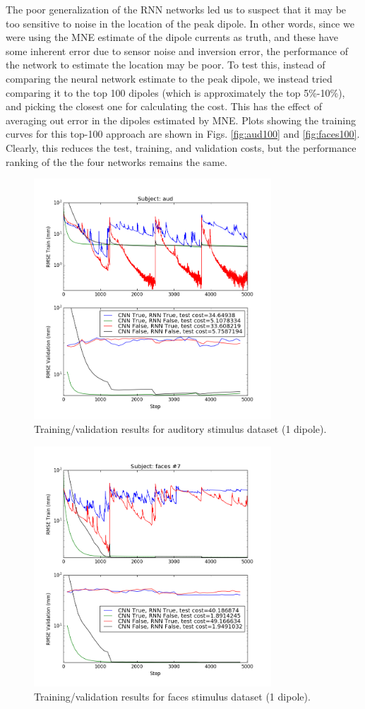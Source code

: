 \documentclass[journal]{IEEEtran}
\begin{document}
The poor generalization of the RNN networks led us to suspect that it may be too sensitive to noise in the location of the peak dipole. In other words, since we were using the MNE estimate of the dipole currents as truth, and these have some inherent error due to sensor noise and inversion error, the performance of the network to estimate the location may be poor. To test this, instead of comparing the neural network estimate to the peak dipole, we instead tried comparing it to the top 100 dipoles (which is approximately the top 5\%-10\%), and picking the closest one for calculating the cost. This has the effect of averaging out error in the dipoles estimated by MNE. Plots showing the training curves for this top-100 approach are shown in Figs. \ref{fig:aud100} and \ref{fig:faces100}. Clearly, this reduces the test, training, and validation costs, but the performance ranking of the the four networks remains the same.

\begin{figure}[!t]
\centering
\includegraphics[width=3.5in]{aud1}
\caption{Training/validation results for auditory stimulus dataset (1 dipole).}
\label{fig:aud}
\end{figure}

\begin{figure}[!t]
\centering
\includegraphics[width=3.5in]{faces1}
\caption{Training/validation results for faces stimulus dataset (1 dipole).}
\label{fig:faces}
\end{figure}
\end{document}
